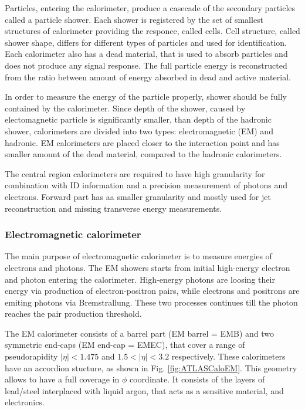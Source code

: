 Particles, entering the calorimeter, produce a casecade of the secondary particles called a particle shower. Each shower is registered by the set of smallest structures of calorimeter providing the responce, called cells. Cell structure, called shower shape, differs for different types of particles and used for identification. Each calorimeter also has a dead material, that is used to absorb particles and does not produce any signal response. The full particle energy is reconstructed from the ratio between amount of energy absorbed in dead and active material.

In order to measure the energy of the particle properly, shower should be fully contained by the calorimeter. Since depth of the shower, caused by electomagnetic particle is significantly smaller, than depth of the hadronic shower, calorimeters are divided into two types: electromagnetic (EM) and hadronic. EM calorimeters are placed closer to the interaction point and has smaller amount of the dead material, compared to the hadronic calorimeters.

The central region calorimeters are required to have high granularity for combination with ID information and a precision measurement of photons and electrons. Forward part has aa smaller granularity and mostly used for jet reconstruction and missing transverse energy measurements.

\subsubsection{Electromagnetic calorimeter}
\begin{figure}[!tb]
\end{figure}

The main purpose of electromagnetic calorimeter is to measure energies of electrons and photons. The EM showers starts from initial high-energy electron and photon entering the calorimeter. High-energy photons are loosing their energy via production of electron-positron pairs, while electrons and positrons are emiting photons via Bremstrallung. These two processes continues till the photon reaches the pair production threshold. 

The EM calorimeter consists of a barrel part (EM barrel = EMB) and two symmetric end-caps (EM end-cap = EMEC), that cover a range of pseudorapidity $|\eta|<1.475$ and $1.5 < |\eta|<3.2$ respectively. These calorimeters have an accordion stucture, as shown in Fig. \ref{fig:ATLASCaloEM}. This geometry allows to have a full coverage in $\phi$ coordinate.
It consists of the layers of lead/steel interplaced with liquid argon, that acts as a sensitive material, and electronics.

